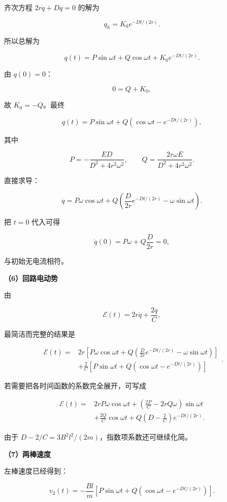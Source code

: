 \documentclass[12pt,a4paper,UTF8]{ctexart}
\begin{document}
齐次方程 \(2r\dot q+Dq=0\) 的解为

\[q_h=K_0e^{-Dt/(2r)}.\]

所以总解为

\[
q(t)=P\sin\omega t+Q\cos\omega t+K_0e^{-Dt/(2r)}.
\]

由 \(q(0)=0\)：

\[0=Q+K_0,\]

故 \(K_0=-Q\)。最终

\[
\boxed{
q(t)=P\sin\omega t+Q\left(\cos\omega t-e^{-Dt/(2r)}\right)
},
\]

其中

\[
P=-\frac{ED}{D^2+4r^2\omega^2},
\qquad
Q=\frac{2r\omega E}{D^2+4r^2\omega^2}.
\]

直接求导：

\[
\boxed{
\dot q=P\omega\cos\omega t
+Q\left(\frac{D}{2r}e^{-Dt/(2r)}-\omega\sin\omega t\right)
}.
\]

把 \(t=0\) 代入可得

\[
\dot q(0)=P\omega+Q\frac{D}{2r}=0,
\]

与初始无电流相符。

\textbf{（6）回路电动势}

由

\[\mathcal E(t)=2r\dot q+\frac{2q}{C},\]

最简洁而完整的结果是

\[
\boxed{
\begin{aligned}
\mathcal E(t)={}&
2r\left[P\omega\cos\omega t
+Q\left(\frac{D}{2r}e^{-Dt/(2r)}-\omega\sin\omega t\right)\right]
\\
&+\frac2C\left[P\sin\omega t
+Q\left(\cos\omega t-e^{-Dt/(2r)}\right)\right]
\end{aligned}
}.
\]

若需要把各时间函数的系数完全展开，可写成

\[
\boxed{
\begin{aligned}
\mathcal E(t)
={}&2rP\omega\cos\omega t
+\left(\frac{2P}{C}-2rQ\omega\right)\sin\omega t\\
&+\frac{2Q}{C}\cos\omega t
+Q\left(D-\frac2C\right)e^{-Dt/(2r)}.
\end{aligned}}
\]

由于 \(D-2/C=3B^2l^2/(2m)\)，指数项系数还可继续化简。

\textbf{（7）两棒速度}

左棒速度已经得到：

\[
\boxed{
v_2(t)=-\frac{Bl}{m}\left[P\sin\omega t+Q\left(\cos\omega t-e^{-Dt/(2r)}\right)\right]
}.
\]
\end{document}

